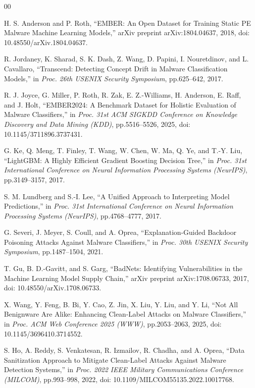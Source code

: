 \begin{thebibliography}{00}

H. S. Anderson and P. Roth,
``EMBER: An Open Dataset for Training Static PE Malware Machine Learning Models,''
arXiv preprint arXiv:1804.04637, 2018,
doi: 10.48550/arXiv.1804.04637.

R. Jordaney, K. Sharad, S. K. Dash, Z. Wang, D. Papini, I. Nouretdinov, and L. Cavallaro,
``Transcend: Detecting Concept Drift in Malware Classification Models,''
in \textit{Proc. 26th USENIX Security Symposium}, pp.625--642, 2017.

R. J. Joyce, G. Miller, P. Roth, R. Zak, E. Z.-Williams, H. Anderson, E. Raff, and J. Holt,
``EMBER2024: A Benchmark Dataset for Holistic Evaluation of Malware Classifiers,''
in \textit{Proc. 31st ACM SIGKDD Conference on Knowledge Discovery and Data Mining (KDD)}, pp.5516--5526, 2025,
doi: 10.1145/3711896.3737431.

G. Ke, Q. Meng, T. Finley, T. Wang, W. Chen, W. Ma, Q. Ye, and T.-Y. Liu,
``LightGBM: A Highly Efficient Gradient Boosting Decision Tree,''
in \textit{Proc. 31st International Conference on Neural Information Processing Systems (NeurIPS)}, pp.3149--3157, 2017.

S. M. Lundberg and S.-I. Lee,
``A Unified Approach to Interpreting Model Predictions,''
in \textit{Proc. 31st International Conference on Neural Information Processing Systems (NeurIPS)}, pp.4768--4777, 2017.

G. Severi, J. Meyer, S. Coull, and A. Oprea,
``Explanation-Guided Backdoor Poisoning Attacks Against Malware Classifiers,''
in \textit{Proc. 30th USENIX Security Symposium}, pp.1487--1504, 2021.

T. Gu, B. D.-Gavitt, and S. Garg,
``BadNets: Identifying Vulnerabilities in the Machine Learning Model Supply Chain,''
arXiv preprint arXiv:1708.06733, 2017,
doi: 10.48550/arXiv.1708.06733.

X. Wang, Y. Feng, B. Bi, Y. Cao, Z. Jin, X. Liu, Y. Liu, and Y. Li,
``Not All Benignware Are Alike: Enhancing Clean-Label Attacks on Malware Classifiers,''
in \textit{Proc. ACM Web Conference 2025 (WWW)}, pp.2053--2063, 2025,
doi: 10.1145/3696410.3714552.

S. Ho, A. Reddy, S. Venkatesan, R. Izmailov, R. Chadha, and A. Oprea,
``Data Sanitization Approach to Mitigate Clean-Label Attacks Against Malware Detection Systems,''
in \textit{Proc. 2022 IEEE Military Communications Conference (MILCOM)}, pp.993--998, 2022,
doi: 10.1109/MILCOM55135.2022.10017768.


\end{thebibliography}
